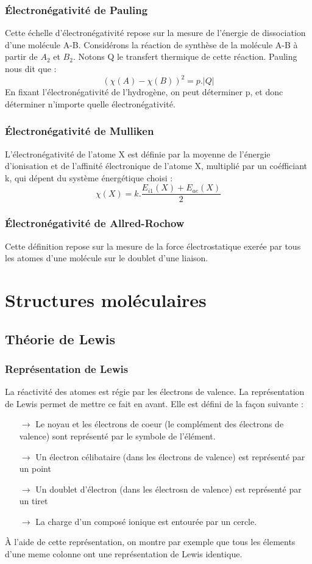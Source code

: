 \subsection{Électronégativité de Pauling}
Cette échelle d'électronégativité repose sur la mesure de l'énergie de dissociation d'une molécule A-B. Considérons la réaction de synthèse de la molécule A-B à partir de $A_2$ et $B_2$. Notons Q le transfert thermique de cette réaction. Pauling nous dit que : 
$$(\chi(A)- \chi(B))^2 = p.|Q|$$
En fixant l'électronégativité de l'hydrogène, on peut déterminer p, et donc déterminer n'importe quelle électronégativité.
\subsection{Électronégativité de Mulliken}
L'électronégativité de l'atome X est définie par la moyenne de l'énergie d'ionisation et de l'affinité électronique de l'atome X, multiplié par un coéfficiant k, qui dépent du système énergétique choisi :
$$\chi(X) = k.\dfrac{E_{i1}(X) + E_{ae}(X)}{2}$$
\subsection{Électronégativité de Allred-Rochow}
Cette définition repose sur la mesure de la force électrostatique exerée par tous les atomes d'une molécule sur le doublet d'une liaison.
\chapter{Structures moléculaires}
\section{Théorie de Lewis}
\subsection{Représentation de Lewis}
La réactivité des atomes est régie par les électrons de valence. La représentation de Lewis permet de mettre ce fait en avant. Elle est défini de la façon suivante : 
\begin{itemize}
 \item[$\rightarrow$] Le noyau et les électrons de coeur (le complément des électrons de valence) sont représenté par le symbole de l'élément.
 \item[$\rightarrow$] Un électron célibataire (dans les électrons de valence) est représenté par un point
 \item[$\rightarrow$] Un doublet d'électron (dans les électrosn de valence) est représenté par un tiret
 \item[$\rightarrow$] La charge d'un composé ionique est entourée par un cercle.
\end{itemize}
À l'aide de cette représentation, on montre par exemple que tous les élements d'une meme colonne ont une représentation de Lewis identique.
